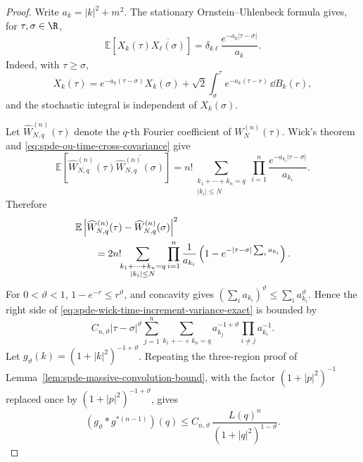 \begin{proof}
Write \(a_k=|k|^2+m^2\).  The stationary Ornstein--Uhlenbeck formula gives,
for \(\tau,\sigma\in\R\),
\begin{equation}
  \mathbb E\!\left[
    X_k(\tau)\overline{X_\ell(\sigma)}
  \right]
  =
  \delta_{k\ell}\frac{e^{-a_k|\tau-\sigma|}}{a_k}.
  \label{eq:spde-ou-time-cross-covariance}
\end{equation}
Indeed, with \(\tau\geq\sigma\),
\[
  X_k(\tau)
  =
  e^{-a_k(\tau-\sigma)}X_k(\sigma)
  +
  \sqrt2\int_{\sigma}^{\tau}e^{-a_k(\tau-r)}\,\dd B_k(r),
\]
and the stochastic integral is independent of \(X_k(\sigma)\).

Let \(\widehat W_{N,q}^{(n)}(\tau)\) denote the \(q\)-th Fourier
coefficient of \(W_N^{(n)}(\tau)\).  Wick's theorem and
\eqref{eq:spde-ou-time-cross-covariance} give
\begin{equation}
  \mathbb E\!\left[
    \widehat W_{N,q}^{(n)}(\tau)
    \overline{\widehat W_{N,q}^{(n)}(\sigma)}
  \right]
  =
  n!\!\!
  \sum_{\substack{k_1+\cdots+k_n=q\\ |k_i|\leq N}}
  \prod_{i=1}^{n}
  \frac{e^{-a_{k_i}|\tau-\sigma|}}{a_{k_i}} .
  \label{eq:spde-wick-time-cross-covariance}
\end{equation}
Therefore
\begin{align}
  &\mathbb E\left|
    \widehat W_{N,q}^{(n)}(\tau)
    -
    \widehat W_{N,q}^{(n)}(\sigma)
  \right|^2
  \notag\\
  &\qquad =
  2n!\!\!
  \sum_{\substack{k_1+\cdots+k_n=q\\ |k_i|\leq N}}
  \prod_{i=1}^{n}\frac1{a_{k_i}}
  \left(
    1-e^{-|\tau-\sigma|\sum_i a_{k_i}}
  \right).
  \label{eq:spde-wick-time-increment-variance-exact}
\end{align}
For \(0<\vartheta<1\), \(1-e^{-r}\leq r^\vartheta\), and concavity gives
\((\sum_i a_{k_i})^\vartheta\leq\sum_i a_{k_i}^{\vartheta}\).  Hence the
right side of
\eqref{eq:spde-wick-time-increment-variance-exact} is bounded by
\[
  C_{n,\vartheta}|\tau-\sigma|^\vartheta
  \sum_{j=1}^n
  \sum_{k_1+\cdots+k_n=q}
  a_{k_j}^{-1+\vartheta}
  \prod_{i\neq j}a_{k_i}^{-1}.
\]
Let \(g_\vartheta(k)=(1+|k|^2)^{-1+\vartheta}\).  Repeating the
three-region proof of
Lemma~\ref{lem:spde-massive-convolution-bound}, with the factor
\((1+|p|^2)^{-1}\) replaced once by
\((1+|p|^2)^{-1+\vartheta}\), gives
\begin{equation}
  (g_\vartheta*g^{*(n-1)})(q)
  \leq
  C_{n,\vartheta}\,
  \frac{L(q)^n}{(1+|q|^2)^{1-\vartheta}} .
  \label{eq:spde-weakened-propagator-convolution-bound}

\end{equation}
\end{proof}
